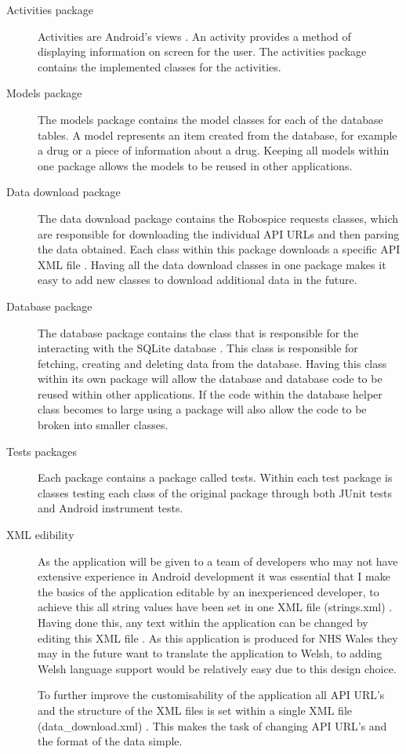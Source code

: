 \begin{description}
	\item[Activities package] Activities are Android's views \cite{android}. An activity provides a method of displaying information on screen for the user. The activities package contains the implemented classes for the activities. 
	\item[Models package] The models package contains the model classes for each of the database tables. A model represents an item created from the database, for example a drug or a piece of information about a drug. Keeping all models within one package allows the models to be reused in other applications.
	\item[Data download package] The data download package contains the Robospice \cite{robospice} requests classes, which are responsible for downloading the individual API URLs and then parsing the data obtained. Each class within this package downloads a specific API XML file \cite{xml}. Having all the data download classes in one package makes it easy to add new classes to download additional data in the future.
	\item[Database package] The database package contains the class that is responsible for the interacting with the SQLite database \cite{sqlite}. This class is responsible for fetching, creating and deleting data from the database. Having this class within its own package will allow the database and database code to be reused within other applications. If the code within the database helper class becomes to large using a package will also allow the code to be broken into smaller classes.
	\item[Tests packages] Each package contains a package called tests. Within each test package is classes testing each class of the original package through both JUnit \cite{junit} tests and Android instrument tests.
	\item[XML edibility] As the application will be given to a team of developers who may not have extensive experience in Android development it was essential that I make the basics of the application editable by an inexperienced developer, to achieve this all string values have been set in one XML file (strings.xml) \cite{strings_xml}. Having done this, any text within the application can be changed by editing this XML file \cite{xml}. As this application is produced for NHS Wales \cite{nhs_website} they may in the future want to translate the application to Welsh, to adding Welsh language support would be relatively easy due to this design choice.

	To further improve the customisability of the application all API URL’s and the structure of the XML files is set within a single XML file (data\_download.xml) \cite{strings_xml}. This makes the task of changing API URL’s and the format of the data simple.

\end{description}

